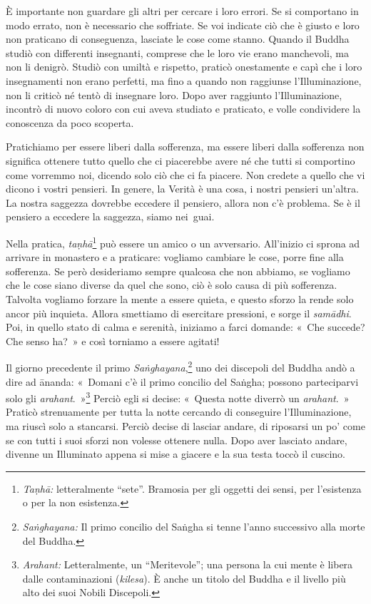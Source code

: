 È importante non guardare gli altri per cercare i loro errori. Se si
comportano in modo errato, non è necessario che soffriate. Se voi
indicate ciò che è giusto e loro non praticano di conseguenza, lasciate
le cose come stanno. Quando il Buddha studiò con differenti insegnanti,
comprese che le loro vie erano manchevoli, ma non li denigrò. Studiò con
umiltà e rispetto, praticò onestamente e capì che i loro insegnamenti
non erano perfetti, ma fino a quando non raggiunse l'Illuminazione, non
li criticò né tentò di insegnare loro. Dopo aver raggiunto
l'Illuminazione, incontrò di nuovo coloro con cui aveva studiato e
praticato, e volle condividere la conoscenza da poco scoperta.

Pratichiamo per essere liberi dalla sofferenza, ma essere liberi dalla
sofferenza non significa ottenere tutto quello che ci piacerebbe avere
né che tutti si comportino come vorremmo noi, dicendo solo ciò che ci fa
piacere. Non credete a quello che vi dicono i vostri pensieri. In
genere, la Verità è una cosa, i nostri pensieri un'altra. La nostra
saggezza dovrebbe eccedere il pensiero, allora non c'è problema. Se è il
pensiero a eccedere la saggezza, siamo nei~guai.

Nella pratica, \emph{taṇhā}\footnote{\emph{Taṇhā:} letteralmente
  ``sete''. Bramosia per gli oggetti dei sensi, per l'esistenza o per la
  non esistenza.} può essere un amico o un avversario. All'inizio ci
sprona ad arrivare in monastero e a praticare: vogliamo cambiare le
cose, porre fine alla sofferenza. Se però desideriamo sempre qualcosa
che non abbiamo, se vogliamo che le cose siano diverse da quel che sono,
ciò è solo causa di più sofferenza. Talvolta vogliamo forzare la mente a
essere quieta, e questo sforzo la rende solo ancor più inquieta. Allora
smettiamo di esercitare pressioni, e sorge il \emph{samādhi}. Poi, in
quello stato di calma e serenità, iniziamo a farci domande: «~Che
succede? Che senso ha?~» e così torniamo a essere agitati!

Il giorno precedente il primo \emph{Saṅghayana},\footnote{\emph{Saṅghayana:} Il
  primo concilio del Saṅgha si tenne l'anno successivo alla morte del
  Buddha.} uno dei discepoli del Buddha andò a dire ad ānanda: «~Domani
c'è il primo concilio del Saṅgha; possono parteciparvi solo gli
\emph{arahant}.~»\footnote{\emph{Arahant:} Letteralmente, un
  ``Meritevole''; una persona la cui mente è libera dalle contaminazioni
  (\emph{kilesa}). È anche un titolo del Buddha e il livello più alto
  dei suoi Nobili Discepoli.} Perciò egli si decise: «~Questa notte
diverrò un \emph{arahant}.~» Praticò strenuamente per tutta la notte
cercando di conseguire l'Illuminazione, ma riuscì solo a stancarsi.
Perciò decise di lasciar andare, di riposarsi un po' come se con tutti i
suoi sforzi non volesse ottenere nulla. Dopo aver lasciato andare,
divenne un Illuminato appena si mise a giacere e la sua testa toccò il
cuscino.

